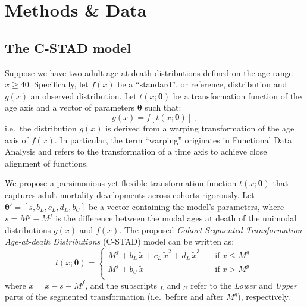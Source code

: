 \documentclass[11pt, a4paper]{article}
\begin{document}
\section{Methods \& Data}
\label{Sec:Methods}
\subsection{The C-STAD model}
\label{Subsec:C-STADmodel}
Suppose we have two adult age-at-death distributions defined on the age range $x \geq 40$. Specifically, let $f(x)$ be a ``standard'', or reference, distribution and $g(x)$ an observed distribution. Let $t(x;\bm{\theta})$ be a transformation function of the age axis and a vector of parameters $\bm{\theta}$ such that:
\begin{equation}\label{Eq:gxftx}
g(x) = f\left[t(x;\bm{\theta})\right]\,, 
\end{equation}  
i.e.~the distribution $g(x)$ is derived from a warping transformation of the age axis of $f(x)$. In particular, the term ``warping'' originates in Functional Data Analysis \citep{ramsay2005FDA} and refers to the transformation of a time axis to achieve close alignment of functions. \par

We propose a parsimonious yet flexible transformation function $t(x;\bm{\theta})$ that captures adult mortality developments across cohorts rigorously. Let $\bm{\theta}' = \left[s,b_{L},c_{L},d_{L},b_{U}\right]$ be a vector containing the model's parameters, where $s = M^{g} - M^{f}$ is the difference between the modal ages at death of the unimodal distributions $g(x)$ and $f(x)$. The proposed \emph{Cohort Segmented Transformation Age-at-death Distributions} (C-STAD) model can be written as: 
\begin{equation}\label{Eq:tx}
t(x;\bm{\theta}) = \left\{ \begin{array}{ll}
M^{f} + b_{L}\,\tilde{x} + c_{L}\,\tilde{x}^2 + d_{L}\,\tilde{x}^3 \quad & \mathrm{if} \; x \leq M^{g} \, \\
M^{f} + b_{U}\,\tilde{x} \quad & \mathrm{if} \; x > M^{g} \\
\end{array}
\right.
\end{equation} 
where $\tilde{x}=x - s - M^{f}$, and the subscripts $_L$ and $_U$ refer to the \textit{Lower} and \textit{Upper} parts of the segmented transformation (i.e.~before and after $M^{g}$), respectively. \par
\end{document}
